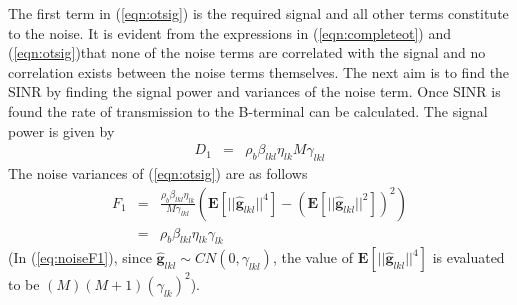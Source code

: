 \documentclass[10pt, a4paper, twoside,fleqn]{article}
\begin{document}
The first term in (\ref{eqn:otsig}) is the required signal and all other terms constitute to the noise. It is evident from the expressions in (\ref{eqn:completeot}) and (\ref{eqn:otsig})that none of the noise terms are correlated with the signal and no correlation exists between the noise terms themselves.
The next aim is to find the SINR by finding the signal power and variances of the noise term. Once SINR is found the rate of transmission to the B-terminal can be calculated.
The signal power is given by
\begin{eqnarray}
	D_1 %
            &=& \rho_b\beta_{lkl}\eta_{lk}M\gamma_{lkl}
\end{eqnarray}
The noise variances of (\ref{eqn:otsig}) are as follows
\begin{eqnarray}\label{eq:noiseF1}
	F_1 %
	    &=& \frac{\rho_b \beta_{lkl} \eta_{lk}}{M\gamma_{lkl}}   \left(\pmb{E}[||\pmb{\hat g}_{lkl}||^4] - (\pmb{E}[||\pmb{\hat g}_{lkl}||^2])^2 \right) \nonumber  \\
	    &=& \rho_b\beta_{lkl}\eta_{lk}\gamma_{lk}
\end{eqnarray}
(In (\ref{eq:noiseF1}), since $\pmb{\hat g}_{lkl} \sim CN(0,\gamma_{lkl})$, the value of $\pmb{E}[||\pmb{\hat g}_{lkl}||^4]$ is evaluated to be $(M)(M+1)(\gamma_{lk})^2$).
\end{document}
